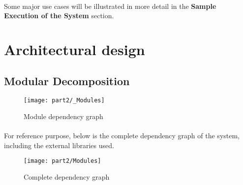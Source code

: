 \documentclass[../gr-final.tex]{subfiles}
\begin{document}
\paragraph{} Some major use cases will be illustrated in more detail in
the {\bfseries Sample Execution of the System} section.


\section{Architectural design}
\subsection{Modular Decomposition}
\begin{figure}[H]
\texttt{[image: part2/\_Modules]}
\caption{Module dependency graph}
\end{figure}
\paragraph{}For reference purpose, below is the complete dependency
graph of the system, including the external libraries used.
\begin{figure}[H]
\texttt{[image: part2/Modules]}
\caption{Complete dependency graph}
\end{figure}
\end{document}
